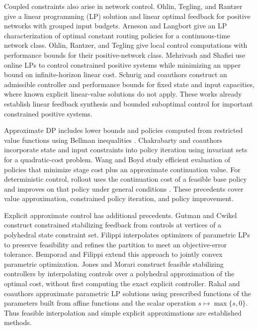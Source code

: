 \documentclass[10pt]{article}
\begin{document}
Coupled constraints also arise in network control. Ohlin, Tegling, and Rantzer \cite{ohlin-tegling-rantzer} give a linear programming (LP) solution and linear optimal feedback for positive networks with grouped input budgets. Arneson and Langbort \cite{arneson-langbort} give an LP characterization of optimal constant routing policies for a continuous-time network class. Ohlin, Rantzer, and Tegling \cite{ohlin-rantzer-tegling} give local control computations with performance bounds for their positive-network class. Mehrivash and Shafiei \cite{mehrivash-shafiei} use online LPs to control constrained positive systems while minimizing an upper bound on infinite-horizon linear cost. Schurig and coauthors \cite{schurig-2026} construct an admissible controller and performance bounds for fixed state and input capacities, where known explicit linear-value solutions do not apply. These works already establish linear feedback synthesis and bounded suboptimal control for important constrained positive systems.

Approximate DP includes lower bounds and policies computed from restricted value functions using Bellman inequalities \cite{de-farias-van-roy,wang-odonoghue-boyd}. Chakrabarty and coauthors \cite{chakrabarty-2019} incorporate state and input constraints into policy iteration using invariant sets for a quadratic-cost problem. Wang and Boyd \cite{wang-boyd-2011} study efficient evaluation of policies that minimize stage cost plus an approximate continuation value. For deterministic control, rollout uses the continuation cost of a feasible base policy and improves on that policy under general conditions \cite{li-johansson-martensson-bertsekas}. These precedents cover value approximation, constrained policy iteration, and policy improvement.

Explicit approximate control has additional precedents. Gutman and Cwikel \cite{gutman-cwikel} construct constrained stabilizing feedback from controls at vertices of a polyhedral state constraint set. Filippi \cite{filippi-2004} interpolates optimizers of parametric LPs to preserve feasibility and refines the partition to meet an objective-error tolerance. Bemporad and Filippi \cite{bemporad-filippi-2006} extend this approach to jointly convex parametric optimization. Jones and Morari \cite{jones-morari} construct feasible stabilizing controllers by interpolating controls over a polyhedral approximation of the optimal cost, without first computing the exact explicit controller. Rahal and coauthors \cite{rahal-2025} approximate parametric LP solutions using prescribed functions of the parameters built from affine functions and the scalar operation $s\mapsto\max\{s,0\}$. Thus feasible interpolation and simple explicit approximations are established methods.
\end{document}
